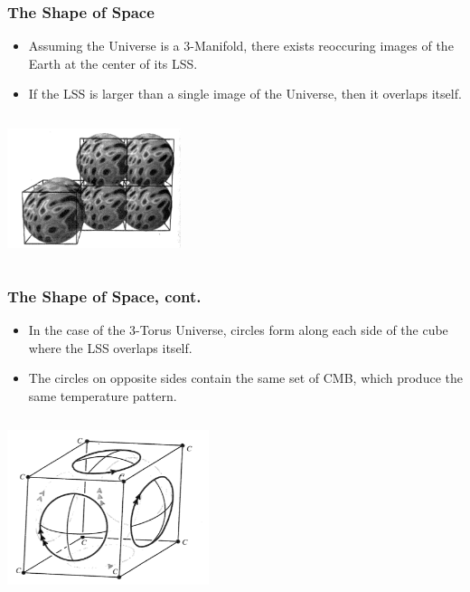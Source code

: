 \documentclass[13pt]{beamer}
\begin{document}
\begin{frame}
\frametitle{The Shape of Space}
  \begin{itemize}
    \item Assuming the Universe is a 3-Manifold, there exists reoccuring images of the Earth at the center of its LSS.
    \item If the LSS is larger than a single image of the Universe, then it overlaps itself.
  \end{itemize}

  \begin{columns}[c] %
     \centering
     \includegraphics[height=3.5cm]{./img/LssIntersecting} %
  \end{columns}
\end{frame}

\begin{frame}
\frametitle{The Shape of Space, cont.}
  \begin{itemize}
    \item In the case of the 3-Torus Universe, circles form along each side of the cube where the LSS overlaps itself.
    \item The circles on opposite sides contain the same set of CMB, which produce the same temperature pattern.
  \end{itemize}

  \begin{columns}[c] %
     \centering
     \includegraphics[height=4.5cm]{./img/shapeofspace} %
  \end{columns}
\end{frame}
\end{document}
